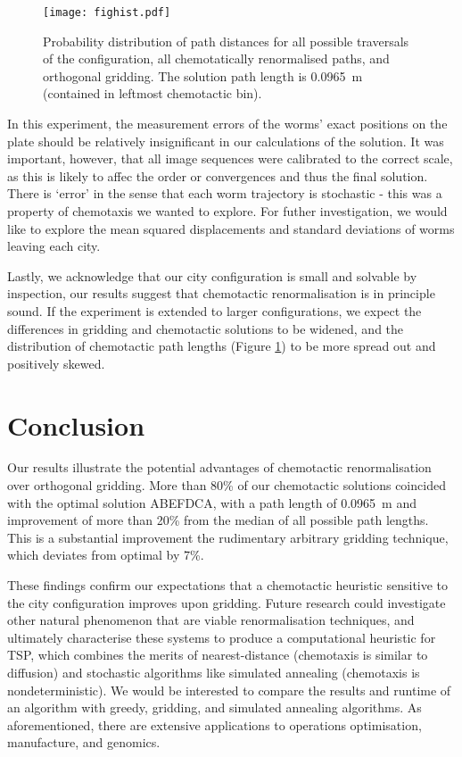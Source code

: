 \documentclass[10pt]{article}
\begin{document}
\begin{figure}[H]
	\centering
    \texttt{[image: fighist.pdf]}
    \caption{Probability distribution of path distances for all possible traversals of the configuration, all chemotatically renormalised paths, and orthogonal gridding. The solution path length is \SI{0.0965}{\metre} (contained in leftmost chemotactic bin).}
    \label{fighist}
\end{figure}

In this experiment, the measurement errors of the worms' exact positions on the plate should be relatively insignificant in our calculations of the solution. It was important, however, that all image sequences were calibrated to the correct scale, as this is likely to affec the order or convergences and thus the final solution. There is `error' in the sense that each worm trajectory is stochastic - this was a property of chemotaxis we wanted to explore. For futher investigation, we would like to explore the mean squared displacements and standard deviations of worms leaving each city.

Lastly, we acknowledge that our city configuration is small and solvable by inspection, our results suggest that chemotactic renormalisation is in principle sound. If the experiment is extended to larger configurations, we expect the differences in gridding and chemotactic solutions to be widened, and the distribution of chemotactic path lengths (Figure \ref{fighist}) to be more spread out and positively skewed.


\section{Conclusion}

Our results illustrate the potential advantages of chemotactic renormalisation over orthogonal gridding. More than 80\% of our chemotactic solutions coincided with the optimal solution ABEFDCA, with a path length of \SI{0.0965}{\metre} and improvement of more than 20\% from the median of all possible path lengths. This is a substantial improvement the rudimentary arbitrary gridding technique, which deviates from optimal by 7\%. 

These findings confirm our expectations that a chemotactic heuristic sensitive to the city configuration improves upon gridding. Future research could investigate other natural phenomenon that are viable renormalisation techniques, and ultimately characterise these systems to produce a computational heuristic for TSP, which combines the merits of nearest-distance (chemotaxis is similar to diffusion) and stochastic algorithms like simulated annealing (chemotaxis is nondeterministic). We would be interested to compare the results and runtime of an algorithm with greedy, gridding, and simulated annealing algorithms. As aforementioned, there are extensive applications to operations optimisation, manufacture, and genomics.
\end{document}
